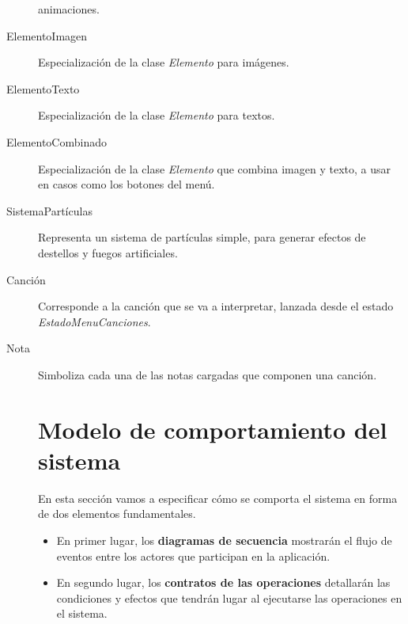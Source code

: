 \begin{description}
  animaciones.
\item[ElementoImagen] Especialización de la clase \textit{Elemento} para
  imágenes.
\item[ElementoTexto] Especialización de la clase \textit{Elemento} para textos.
\item[ElementoCombinado] Especialización de la clase \textit{Elemento} que
  combina imagen y texto, a usar en casos como los botones del menú.
\item[SistemaPartículas] Representa un sistema de partículas simple, para
  generar efectos de destellos y fuegos artificiales.
\item[Canción] Corresponde a la canción que se va a interpretar, lanzada desde
  el estado \textit{EstadoMenuCanciones}.
\item[Nota] Simboliza cada una de las notas cargadas que componen una canción.

\bigskip


\section{Modelo de comportamiento del sistema}
En esta sección vamos a especificar cómo se comporta el sistema en forma de dos
elementos fundamentales.
\begin{itemize}
\item En primer lugar, los \textbf{diagramas de secuencia} mostrarán el flujo de
  eventos entre los actores que participan en la aplicación.
\item En segundo lugar, los \textbf{contratos de las operaciones} detallarán las
  condiciones y efectos que tendrán lugar al ejecutarse las operaciones en el
  sistema.
\end{itemize}





\end{description}